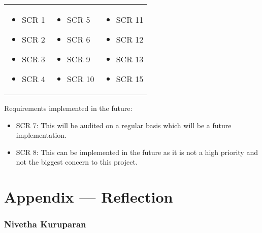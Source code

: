 \documentclass{article}
\begin{document}
\renewcommand{\arraystretch}{1.2}
\begin{tabular}{p{} p{} p{}}
    \begin{itemize}[wide=0pt]
        \item SCR 1
        \item SCR 2
        \item SCR 3
        \item SCR 4
    \end{itemize} &
    \begin{itemize}[wide=0pt]
        \item SCR 5
        \item SCR 6
        \item SCR 9
        \item SCR 10
    \end{itemize} &
    \begin{itemize}[wide=0pt]
        \item SCR 11
        \item SCR 12
        \item SCR 13
        \item SCR 15
    \end{itemize} \\
\end{tabular}

\medskip

\noindent
Requirements implemented in the future:
\begin{itemize}
    \item SCR 7: This will be audited on a regular basis which will be a future implementation.
    \item SCR 8: This can be implemented in the future as it is not a high priority and not the biggest concern to this project.
\end{itemize}

\newpage{}

\section*{Appendix --- Reflection}

\subsubsection*{Nivetha Kuruparan}
\end{document}
